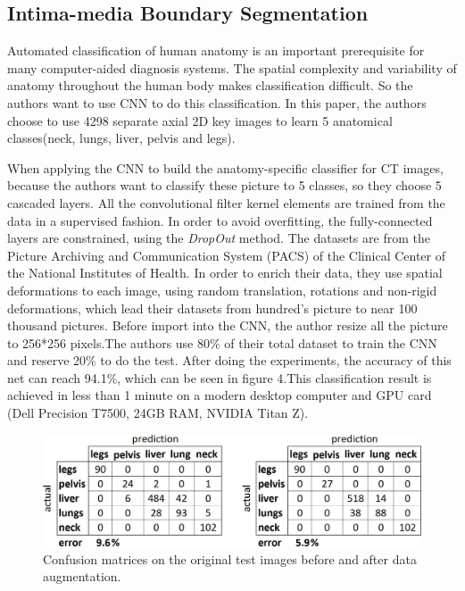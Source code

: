 \documentclass[10pt,twocolumn,letterpaper]{article}
\begin{document}
\subsection{Intima-media Boundary Segmentation}

Automated classification of human anatomy is an important prerequisite for many computer-aided diagnosis systems. The spatial complexity and variability of anatomy throughout the human body makes classification difficult. So the authors want to use CNN to do this classification. In this paper, the authors choose to use 4298 separate axial 2D key images to learn 5 anatomical classes(neck, lungs, liver, pelvis and legs)\cite{roth2015anatomy}.

When applying the CNN to build the anatomy-specific classifier for CT images, because the authors want to classify these picture to 5 classes, so they choose 5 cascaded layers. All the convolutional filter kernel elements are trained from the data in a supervised fashion. In order to avoid overfitting, the fully-connected layers are constrained, using the \textit{DropOut} method. The datasets are from the Picture Archiving and Communication System (PACS) of the Clinical Center of the National Institutes of Health. In order to enrich their data, they use spatial deformations to each image, using random translation, rotations and non-rigid deformations, which lead their datasets from hundred's picture to near 100 thousand pictures. Before import into the CNN, the author resize all the picture to 256*256 pixels.The authors use 80\% of their total dataset to train the CNN and reserve 20\% to do the test. After doing the experiments, the accuracy of this net can reach 94.1\%, which can be seen in figure 4.This classification
result is achieved in less than 1 minute on a modern desktop computer and GPU card (Dell Precision T7500,
24GB RAM, NVIDIA Titan Z).

\begin{figure}[t]
	\begin{center}
		\includegraphics[width=0.8\linewidth]{Pic/1.jpg}
	\end{center}
	\caption{Confusion matrices on the original test images before and after data augmentation.} \label{fig:long}
	\label{fig:onecol}
\end{figure}
\end{document}
